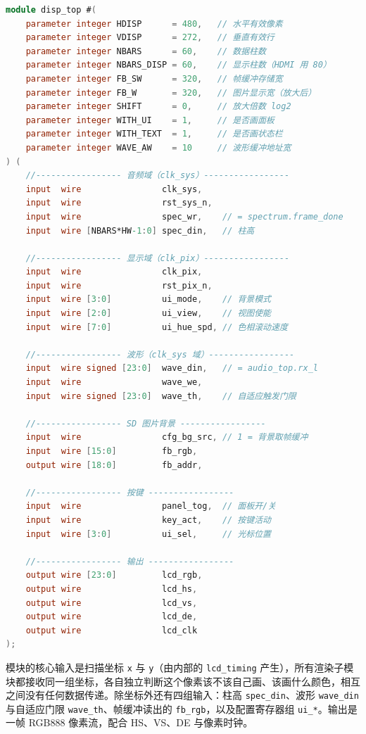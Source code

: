 \documentclass[withoutpreface,bwprint]{cumcmthesis}
\begin{document}
\begin{lstlisting}[language=Verilog, basicstyle=\ttfamily\zihao{6},
                   frame=single, rulecolor=\color{boxFrame}]
module disp_top #(
    parameter integer HDISP      = 480,   // 水平有效像素
    parameter integer VDISP      = 272,   // 垂直有效行
    parameter integer NBARS      = 60,    // 数据柱数
    parameter integer NBARS_DISP = 60,    // 显示柱数（HDMI 用 80）
    parameter integer FB_SW      = 320,   // 帧缓冲存储宽
    parameter integer FB_W       = 320,   // 图片显示宽（放大后）
    parameter integer SHIFT      = 0,     // 放大倍数 log2
    parameter integer WITH_UI    = 1,     // 是否画面板
    parameter integer WITH_TEXT  = 1,     // 是否画状态栏
    parameter integer WAVE_AW    = 10     // 波形缓冲地址宽
) (
    //----------------- 音频域（clk_sys）-----------------
    input  wire                clk_sys,
    input  wire                rst_sys_n,
    input  wire                spec_wr,    // = spectrum.frame_done
    input  wire [NBARS*HW-1:0] spec_din,   // 柱高

    //----------------- 显示域（clk_pix）-----------------
    input  wire                clk_pix,
    input  wire                rst_pix_n,
    input  wire [3:0]          ui_mode,    // 背景模式
    input  wire [2:0]          ui_view,    // 视图使能
    input  wire [7:0]          ui_hue_spd, // 色相滚动速度

    //----------------- 波形（clk_sys 域）-----------------
    input  wire signed [23:0]  wave_din,   // = audio_top.rx_l
    input  wire                wave_we,
    input  wire signed [23:0]  wave_th,    // 自适应触发门限

    //----------------- SD 图片背景 -----------------
    input  wire                cfg_bg_src, // 1 = 背景取帧缓冲
    input  wire [15:0]         fb_rgb,
    output wire [18:0]         fb_addr,

    //----------------- 按键 -----------------
    input  wire                panel_tog,  // 面板开/关
    input  wire                key_act,    // 按键活动
    input  wire [3:0]          ui_sel,     // 光标位置

    //----------------- 输出 -----------------
    output wire [23:0]         lcd_rgb,
    output wire                lcd_hs,
    output wire                lcd_vs,
    output wire                lcd_de,
    output wire                lcd_clk
);
\end{lstlisting}

模块的核心输入是扫描坐标 \texttt{x} 与 \texttt{y}（由内部的 \texttt{lcd\_timing} 产生），所有渲染子模块都接收同一组坐标，各自独立判断这个像素该不该自己画、该画什么颜色，相互之间没有任何数据传递。除坐标外还有四组输入：柱高 \texttt{spec\_din}、波形 \texttt{wave\_din}与自适应门限 \texttt{wave\_th}、帧缓冲读出的 \texttt{fb\_rgb}，以及配置寄存器组 \texttt{ui\_*}。输出是一帧 RGB888 像素流，配合 HS、VS、DE 与像素时钟。
\end{document}
